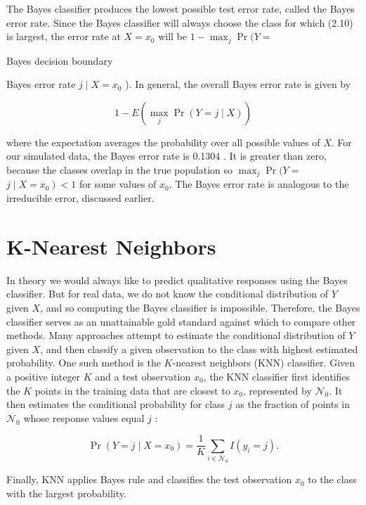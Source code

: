 \documentclass[10pt]{article}
\begin{document}
The Bayes classifier produces the lowest possible test error rate, called the Bayes error rate. Since the Bayes classifier will always choose the class for which (2.10) is largest, the error rate at $X=x_{0}$ will be $1-\max _{j} \operatorname{Pr}(Y=$

Bayes decision boundary

Bayes error rate $j \mid X=x_{0}$ ). In general, the overall Bayes error rate is given by


\begin{equation*}
1-E\left(\max _{j} \operatorname{Pr}(Y=j \mid X)\right) \tag{2.11}
\end{equation*}


where the expectation averages the probability over all possible values of $X$. For our simulated data, the Bayes error rate is 0.1304 . It is greater than zero, because the classes overlap in the true population so $\max _{j} \operatorname{Pr}(Y=$ $\left.j \mid X=x_{0}\right)<1$ for some values of $x_{0}$. The Bayes error rate is analogous to the irreducible error, discussed earlier.

\section*{K-Nearest Neighbors}
In theory we would always like to predict qualitative responses using the Bayes classifier. But for real data, we do not know the conditional distribution of $Y$ given $X$, and so computing the Bayes classifier is impossible. Therefore, the Bayes classifier serves as an unattainable gold standard against which to compare other methods. Many approaches attempt to estimate the conditional distribution of $Y$ given $X$, and then classify a given observation to the class with highest estimated probability. One such method is the $K$-nearest neighbors (KNN) classifier. Given a positive integer $K$ and a test observation $x_{0}$, the KNN classifier first identifies the $K$ points in the training data that are closest to $x_{0}$, represented by $\mathcal{N}_{0}$. It then estimates the conditional probability for class $j$ as the fraction of points in $\mathcal{N}_{0}$ whose response values equal $j$ :


\begin{equation*}
\operatorname{Pr}\left(Y=j \mid X=x_{0}\right)=\frac{1}{K} \sum_{i \in \mathcal{N}_{0}} I\left(y_{i}=j\right) . \tag{2.12}
\end{equation*}


Finally, KNN applies Bayes rule and classifies the test observation $x_{0}$ to the class with the largest probability.
\end{document}
